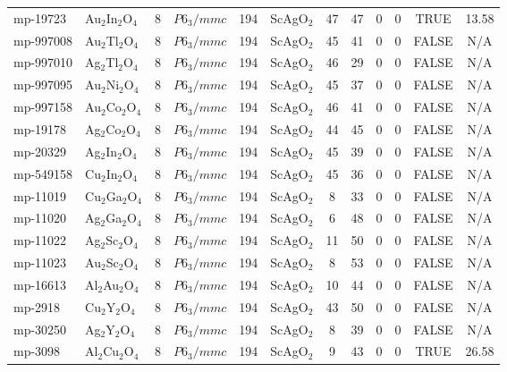 {\begin{longtable}{llcccccccccc}
    mp-19723 & Au$_{2}$In$_{2}$O$_{4}$ & 8     & $P6_3/mmc$ & 194   & ScAgO$_{2}$ & 47    & 47    & 0     & 0     & TRUE  & 13.58  \\
    mp-997008 & Au$_{2}$Tl$_{2}$O$_{4}$ & 8     & $P6_3/mmc$ & 194   & ScAgO$_{2}$ & 45    & 41    & 0     & 0     & FALSE & N/A \\
    mp-997010 & Ag$_{2}$Tl$_{2}$O$_{4}$ & 8     & $P6_3/mmc$ & 194   & ScAgO$_{2}$ & 46    & 29    & 0     & 0     & FALSE & N/A \\
    mp-997095 & Au$_{2}$Ni$_{2}$O$_{4}$ & 8     & $P6_3/mmc$ & 194   & ScAgO$_{2}$ & 45    & 37    & 0     & 0     & FALSE & N/A \\
    mp-997158 & Au$_{2}$Co$_{2}$O$_{4}$ & 8     & $P6_3/mmc$ & 194   & ScAgO$_{2}$ & 46    & 41    & 0     & 0     & FALSE & N/A \\
    mp-19178 & Ag$_{2}$Co$_{2}$O$_{4}$ & 8     & $P6_3/mmc$ & 194   & ScAgO$_{2}$ & 44    & 45    & 0     & 0     & FALSE & N/A \\
    mp-20329 & Ag$_{2}$In$_{2}$O$_{4}$ & 8     & $P6_3/mmc$ & 194   & ScAgO$_{2}$ & 45    & 39    & 0     & 0     & FALSE & N/A \\
    mp-549158 & Cu$_{2}$In$_{2}$O$_{4}$ & 8     & $P6_3/mmc$ & 194   & ScAgO$_{2}$ & 45    & 36    & 0     & 0     & FALSE & N/A \\
    mp-11019 & Cu$_{2}$Ga$_{2}$O$_{4}$ & 8     & $P6_3/mmc$ & 194   & ScAgO$_{2}$ & 8     & 33    & 0     & 0     & FALSE & N/A \\
    mp-11020 & Ag$_{2}$Ga$_{2}$O$_{4}$ & 8     & $P6_3/mmc$ & 194   & ScAgO$_{2}$ & 6     & 48    & 0     & 0     & FALSE & N/A \\
    mp-11022 & Ag$_{2}$Sc$_{2}$O$_{4}$ & 8     & $P6_3/mmc$ & 194   & ScAgO$_{2}$ & 11    & 50    & 0     & 0     & FALSE & N/A \\
    mp-11023 & Au$_{2}$Sc$_{2}$O$_{4}$ & 8     & $P6_3/mmc$ & 194   & ScAgO$_{2}$ & 8     & 53    & 0     & 0     & FALSE & N/A \\
    mp-16613 & Al$_{2}$Au$_{2}$O$_{4}$ & 8     & $P6_3/mmc$ & 194   & ScAgO$_{2}$ & 10    & 44    & 0     & 0     & FALSE & N/A \\
    mp-2918 & Cu$_{2}$Y$_{2}$O$_{4}$ & 8     & $P6_3/mmc$ & 194   & ScAgO$_{2}$ & 43    & 50    & 0     & 0     & FALSE & N/A \\
    mp-30250 & Ag$_{2}$Y$_{2}$O$_{4}$ & 8     & $P6_3/mmc$ & 194   & ScAgO$_{2}$ & 8     & 39    & 0     & 0     & FALSE & N/A \\
    mp-3098 & Al$_{2}$Cu$_{2}$O$_{4}$ & 8     & $P6_3/mmc$ & 194   & ScAgO$_{2}$ & 9     & 43    & 0     & 0     & TRUE  & 26.58  \\

\end{longtable}}
